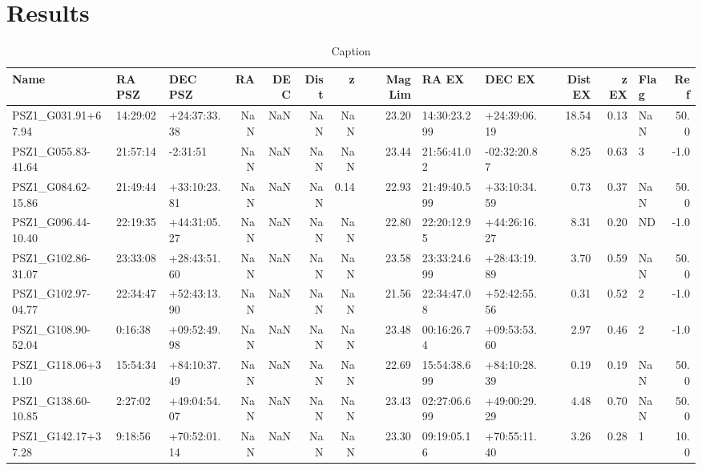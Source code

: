 \documentclass[apj, revtex4]{emulateapj}
\begin{document}
\section{Results}\label{sec:results}

\begin{table}
	\caption[Caption]{Caption}
	
	\tiny
\begin{tabular}{lllrrrrrllrrlr}
	\hline
	Name &    RA PSZ &       DEC PSZ &  RA &  DEC &  Dist &    z &  Mag Lim &         RA EX &        DEC EX &  Dist EX &  z EX & Flag &   Ref \\
	\hline
 PSZ1\_G031.91+67.94 &  14:29:02 &  +24:37:33.38 & NaN &  NaN &   NaN &  NaN &    23.20 &  14:30:23.299 &  +24:39:06.19 &    18.54 &  0.13 &  NaN &  50.0 \\
 PSZ1\_G055.83-41.64 &  21:57:14 &      -2:31:51 & NaN &  NaN &   NaN &  NaN &    23.44 &   21:56:41.02 &  -02:32:20.87 &     8.25 &  0.63 &    3 &  -1.0 \\
 PSZ1\_G084.62-15.86 &  21:49:44 &  +33:10:23.81 & NaN &  NaN &   NaN & 0.14 &    22.93 &  21:49:40.599 &  +33:10:34.59 &     0.73 &  0.37 &  NaN &  50.0 \\
 PSZ1\_G096.44-10.40 &  22:19:35 &  +44:31:05.27 & NaN &  NaN &   NaN &  NaN &    22.80 &   22:20:12.95 &  +44:26:16.27 &     8.31 &  0.20 &   ND &  -1.0 \\
 PSZ1\_G102.86-31.07 &  23:33:08 &  +28:43:51.60 & NaN &  NaN &   NaN &  NaN &    23.58 &  23:33:24.699 &  +28:43:19.89 &     3.70 &  0.59 &  NaN &  50.0 \\
 PSZ1\_G102.97-04.77 &  22:34:47 &  +52:43:13.90 & NaN &  NaN &   NaN &  NaN &    21.56 &   22:34:47.08 &  +52:42:55.56 &     0.31 &  0.52 &    2 &  -1.0 \\
 PSZ1\_G108.90-52.04 &   0:16:38 &  +09:52:49.98 & NaN &  NaN &   NaN &  NaN &    23.48 &   00:16:26.74 &  +09:53:53.60 &     2.97 &  0.46 &    2 &  -1.0 \\
 PSZ1\_G118.06+31.10 &  15:54:34 &  +84:10:37.49 & NaN &  NaN &   NaN &  NaN &    22.69 &  15:54:38.699 &  +84:10:28.39 &     0.19 &  0.19 &  NaN &  50.0 \\
 PSZ1\_G138.60-10.85 &   2:27:02 &  +49:04:54.07 & NaN &  NaN &   NaN &  NaN &    23.43 &  02:27:06.699 &  +49:00:29.29 &     4.48 &  0.70 &  NaN &  50.0 \\
 PSZ1\_G142.17+37.28 &   9:18:56 &  +70:52:01.14 & NaN &  NaN &   NaN &  NaN &    23.30 &   09:19:05.16 &  +70:55:11.40 &     3.26 &  0.28 &    1 &  10.0 \\

\end{tabular}
\end{table}
\end{document}
